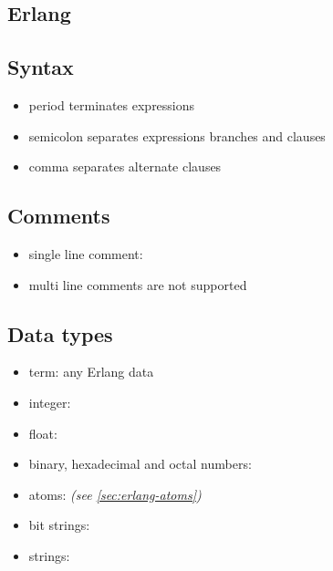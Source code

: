 \documentclass[a4paper,landscape,10pt]{article}
\begin{document}
\begin{multicols*}{2}

  \section{Erlang}

  \subsection{Syntax}

  \begin{itemize}
    \item period  terminates expressions
    \item semicolon \ierlang{;} separates expressions branches and clauses
    \item comma \ierlang{,} separates alternate clauses
  \end{itemize}

  \subsection{Comments}

  \begin{itemize}
    \item single line comment: \ierlang{\%}
    \item multi line comments are not supported
  \end{itemize}

  \begin{erlang}
\end{erlang}

  \subsection{Data types}

  \begin{itemize}
    \item term: any Erlang data
    \item integer: 
    \item float: 
    \item binary, hexadecimal and octal numbers: 
    \item atoms:  \textit{(see \ref{sec:erlang-atoms})}
    \item bit strings: 
    \item strings: 
  \end{itemize}


\end{multicols*}
\end{document}
